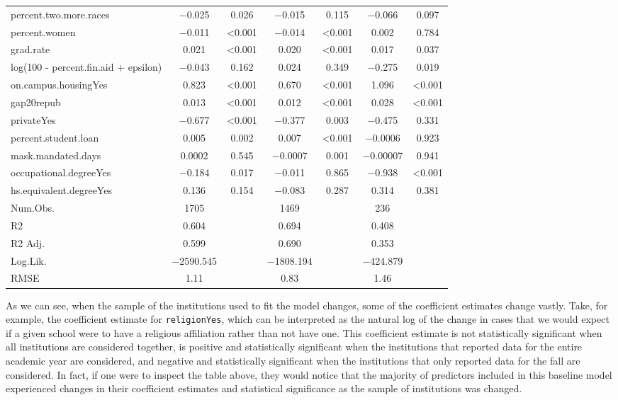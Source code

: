 \documentclass[
]{article}
\begin{document}
\begin{table}
\begin{tabular}[t]{lcccccc}
percent.two.more.races & \num{-0.025} & \num{0.026} & \num{-0.015} & \num{0.115} & \num{-0.066} & \num{0.097}\\
percent.women & \num{-0.011} & \num{<0.001} & \num{-0.014} & \num{<0.001} & \num{0.002} & \num{0.784}\\
grad.rate & \num{0.021} & \num{<0.001} & \num{0.020} & \num{<0.001} & \num{0.017} & \num{0.037}\\
log(100 - percent.fin.aid + epsilon) & \num{-0.043} & \num{0.162} & \num{0.024} & \num{0.349} & \num{-0.275} & \num{0.019}\\
on.campus.housingYes & \num{0.823} & \num{<0.001} & \num{0.670} & \num{<0.001} & \num{1.096} & \num{<0.001}\\
gap20repub & \num{0.013} & \num{<0.001} & \num{0.012} & \num{<0.001} & \num{0.028} & \num{<0.001}\\
privateYes & \num{-0.677} & \num{<0.001} & \num{-0.377} & \num{0.003} & \num{-0.475} & \num{0.331}\\
percent.student.loan & \num{0.005} & \num{0.002} & \num{0.007} & \num{<0.001} & \num{-0.0006} & \num{0.923}\\
mask.mandated.days & \num{0.0002} & \num{0.545} & \num{-0.0007} & \num{0.001} & \num{-0.00007} & \num{0.941}\\
occupational.degreeYes & \num{-0.184} & \num{0.017} & \num{-0.011} & \num{0.865} & \num{-0.938} & \num{<0.001}\\
hs.equivalent.degreeYes & \num{0.136} & \num{0.154} & \num{-0.083} & \num{0.287} & \num{0.314} & \num{0.381}\\
\midrule
Num.Obs. & \num{1705} &  & \num{1469} &  & \num{236} & \\
R2 & \num{0.604} &  & \num{0.694} &  & \num{0.408} & \\
R2 Adj. & \num{0.599} &  & \num{0.690} &  & \num{0.353} & \\
Log.Lik. & \num{-2590.545} &  & \num{-1808.194} &  & \num{-424.879} & \\
RMSE & \num{1.11} &  & \num{0.83} &  & \num{1.46} & \\
\bottomrule
\end{tabular}
\end{table}

As we can see, when the sample of the institutions used to fit the model
changes, some of the coefficient estimates change vastly. Take, for
example, the coefficient estimate for \texttt{religionYes}, which can be
interpreted as the natural log of the change in cases that we would
expect if a given school were to have a religious affiliation rather
than not have one. This coefficient estimate is not statistically
significant when all institutions are considered together, is positive
and statistically significant when the institutions that reported data
for the entire academic year are considered, and negative and
statistically significant when the institutions that only reported data
for the fall are considered. In fact, if one were to inspect the table
above, they would notice that the majority of predictors included in
this baseline model experienced changes in their coefficient estimates
and statistical significance as the sample of institutions was changed.
\end{document}
